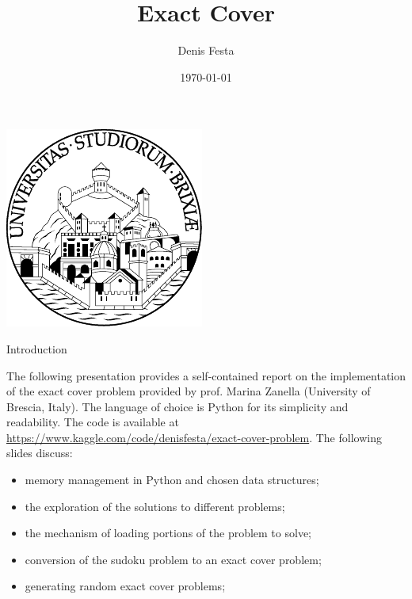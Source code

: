 \documentclass{beamer}
\title{Exact Cover}
\author{Denis Festa}
\date{\today}
\begin{document}
\begin{frame}
    \titlepage
    \centering
    \includegraphics[width=0.2\linewidth]{unibs-circ-logo.pdf}
\end{frame}




\begin{frame}{Introduction}

    The following presentation provides a self-contained report on the 
    implementation of the exact cover problem provided by prof. Marina Zanella
    (University of Brescia, Italy).
    The language of choice is Python for its simplicity and readability.
    The code is available at \url{https://www.kaggle.com/code/denisfesta/exact-cover-problem}.
    The following slides discuss:
    \begin{itemize}
        \item memory management in Python and chosen data structures;
        \item the exploration of the solutions to different problems;
        \item the mechanism of loading portions of the problem to solve;
        \item conversion of the sudoku problem to an exact cover problem;
        \item generating random exact cover problems;
    \end{itemize}

\end{frame}
\end{document}
